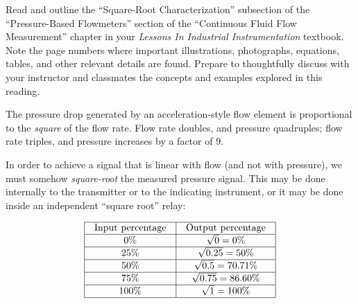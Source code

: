 

Read and outline the ``Square-Root Characterization'' subsection of the ``Pressure-Based Flowmeters'' section of the ``Continuous Fluid Flow Measurement'' chapter in your {\it Lessons In Industrial Instrumentation} textbook.  Note the page numbers where important illustrations, photographs, equations, tables, and other relevant details are found.  Prepare to thoughtfully discuss with your instructor and classmates the concepts and examples explored in this reading.














The pressure drop generated by an acceleration-style flow element is proportional to the {\it square} of the flow rate.  Flow rate doubles, and pressure quadruples; flow rate triples, and pressure increases by a factor of 9.

\vskip 10pt

In order to achieve a signal that is linear with flow (and not with pressure), we must somehow {\it square-root} the measured pressure signal.  This may be done internally to the transmitter or to the indicating instrument, or it may be done inside an independent ``square root'' relay:


$$\vbox{\offinterlineskip
\halign{\strut
\vrule \quad\hfil # \ \hfil & 
\vrule \quad\hfil # \ \hfil \vrule \cr
\noalign{\hrule}
%
Input percentage & Output percentage \cr
%
\noalign{\hrule}
%
0\% & $\sqrt{0} = 0\%$ \cr
%
\noalign{\hrule}
%
25\% & $\sqrt{0.25} = 50\%$ \cr
%
\noalign{\hrule}
%
50\% & $\sqrt{0.5} = 70.71\%$ \cr
%
\noalign{\hrule}
%
75\% & $\sqrt{0.75} = 86.60\%$ \cr
%
\noalign{\hrule}
%
100\% & $\sqrt{1} = 100\%$ \cr
%
\noalign{\hrule}
} %
}$$ %

